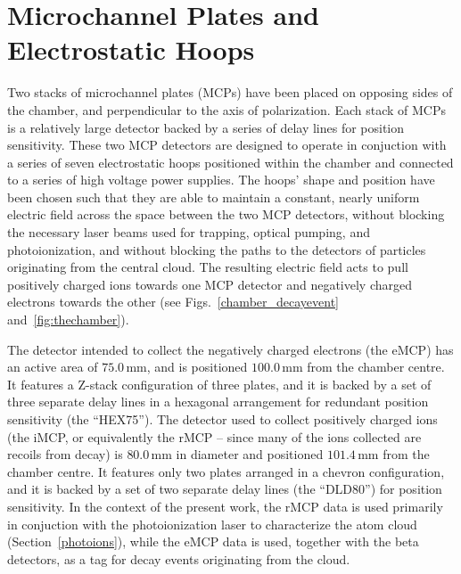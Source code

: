 \section{Microchannel Plates and Electrostatic Hoops}
\label{section:mcps}
\label{section:field}
Two stacks of microchannel plates (MCPs) have been placed on opposing sides of the chamber, and perpendicular to the axis of polarization.  Each stack of MCPs is a relatively large detector backed by a series of delay lines for position sensitivity.  These two MCP detectors are designed to operate in conjuction with a series of seven electrostatic hoops positioned within the chamber and connected to a series of high voltage power supplies.  The hoops' shape and position have been chosen such that they are able to maintain  
a constant, nearly uniform electric field across the space between the two MCP detectors, without blocking the necessary laser beams used for trapping, optical pumping, and photoionization, and without blocking the paths to the detectors of particles originating from the central cloud.
The resulting electric field acts to pull positively charged ions towards one MCP detector and negatively charged electrons towards the other (see Figs.~\ref{chamber_decayevent} and~\ref{fig:thechamber}).  


The detector intended to collect the negatively charged electrons (the \acs{eMCP}) has an active area of $75.0\,$mm, and is positioned 
$100.0\,$mm from the chamber centre.  It features a Z-stack configuration of three plates, and it is backed by a set of three separate delay lines in a hexagonal arrangement for redundant position sensitivity (the ``HEX75'').  The detector used to collect positively charged ions (the \acs{iMCP}, or equivalently the \acs{rMCP} -- since many of the ions collected are recoils from decay) is $80.0\,$mm in diameter and positioned $101.4\,$mm from the chamber centre.  It features only two plates arranged in a chevron configuration, and it is backed by a set of two separate delay lines (the ``DLD80'') for position sensitivity.  
%
In the context of the present work, the \ac{rMCP} data is used primarily in conjuction with the photoionization laser to characterize the atom cloud (Section~\ref{photoions}), while the \ac{eMCP} data is used, together with the beta detectors, as a tag for decay events originating from the cloud. 





